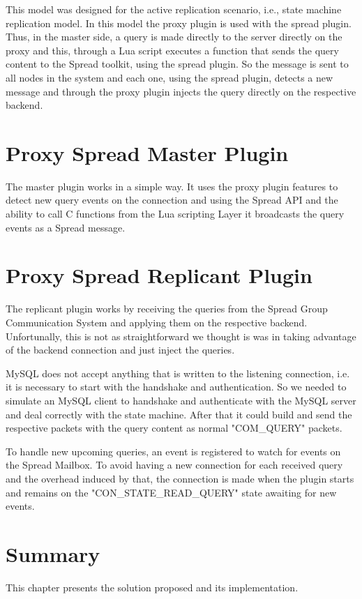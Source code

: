 This model was designed for the active replication scenario, i.e., state machine replication model. In this model the proxy plugin is used with the spread plugin. Thus, in the master side, a query is made directly to the server directly on the proxy and this, through a Lua script executes a function that sends the query content to the Spread toolkit, using the spread plugin. So the message is sent to all nodes in the system and each one, using the spread plugin, detects a new message and through the proxy plugin injects the query directly on the respective backend.






\section{Proxy Spread Master Plugin}


The master plugin works in a simple way. It uses the proxy plugin features to detect new query events on the connection and using the Spread API and the ability to call C functions from the Lua scripting Layer it broadcasts the query events as a Spread message.


\section{Proxy Spread Replicant Plugin}


The replicant plugin works by receiving the queries from the Spread Group Communication System and applying them on the respective backend. Unfortunally, this is not as straightforward we thought is was in taking advantage of the backend connection and just inject the queries.

MySQL does not accept anything that is written to the listening connection, i.e. it is necessary to start with the handshake and authentication. So we needed to simulate an MySQL client to handshake and authenticate with the MySQL server and deal correctly with the state machine. After that it could build and send the respective packets with the query content as normal "COM\_QUERY" packets.

To handle new upcoming queries, an event is registered to watch for events on the Spread Mailbox. To avoid having a new connection for each received query and the overhead induced by that, the connection is made when the plugin starts and remains on the "CON\_STATE\_READ\_QUERY" state awaiting for new events. 


\section{Summary}

This chapter presents the solution proposed and its implementation. 